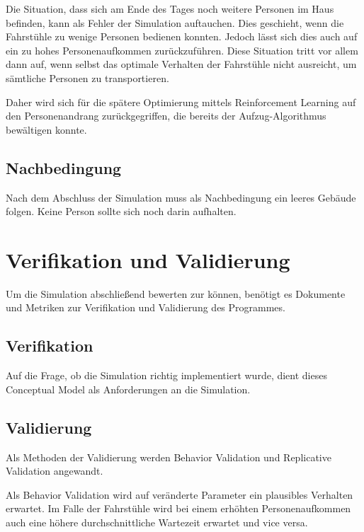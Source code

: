 \documentclass[envcountsame, envcountchap, deutsch]{i-studis}
\begin{document}
Die Situation, dass sich am Ende des Tages noch weitere Personen im Haus
befinden, kann als Fehler der Simulation auftauchen. Dies geschieht,
wenn die Fahrstühle zu wenige Personen bedienen konnten. Jedoch lässt
sich dies auch auf ein zu hohes Personenaufkommen zurückzuführen. Diese
Situation tritt vor allem dann auf, wenn selbst das optimale Verhalten
der Fahrstühle nicht ausreicht, um sämtliche Personen zu transportieren.

Daher wird sich für die spätere Optimierung mittels Reinforcement
Learning auf den Personenandrang zurückgegriffen, die bereits der
Aufzug-Algorithmus bewältigen konnte.

\hypertarget{nachbedingung}{%
\section{Nachbedingung}\label{nachbedingung}}

Nach dem Abschluss der Simulation muss als Nachbedingung ein leeres
Gebäude folgen. Keine Person sollte sich noch darin aufhalten.

\hypertarget{verifikation-und-validierung}{%
\chapter{Verifikation und
Validierung}\label{verifikation-und-validierung}}

Um die Simulation abschließend bewerten zur können, benötigt es
Dokumente und Metriken zur Verifikation und Validierung des Programmes.

\hypertarget{verifikation}{%
\section{Verifikation}\label{verifikation}}

Auf die Frage, ob die Simulation richtig implementiert wurde, dient
dieses Conceptual Model als Anforderungen an die Simulation.

\hypertarget{validierung}{%
\section{Validierung}\label{validierung}}

Als Methoden der Validierung werden Behavior Validation und Replicative
Validation angewandt.

Als Behavior Validation wird auf veränderte Parameter ein plausibles
Verhalten erwartet. Im Falle der Fahrstühle wird bei einem erhöhten
Personenaufkommen auch eine höhere durchschnittliche Wartezeit erwartet
und vice versa.
\end{document}
